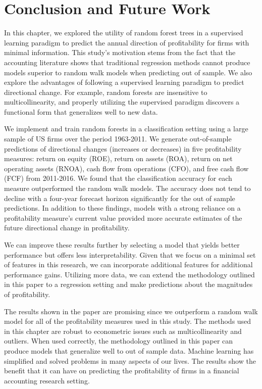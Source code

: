 \section{Conclusion and Future Work}

In this chapter, we explored the utility of random forest trees in a supervised learning paradigm to predict the annual direction of profitability for firms with minimal information. This study's motivation stems from the fact that the accounting literature shows that traditional regression methods cannot produce models superior to random walk models when predicting out of sample. We also explore the advantages of following a supervised learning paradigm to predict directional change. For example, random forests are insensitive to multicollinearity, and properly utilizing the supervised paradigm discovers a functional form that generalizes well to new data.

We implement and train random forests in a classification setting using a large sample of US firms over the period 1963-2011.  We generate out-of-sample predictions of directional changes (increases or decreases) in five profitability measures: return on equity (ROE), return on assets (ROA), return on net operating assets (RNOA), cash flow from operations (CFO), and free cash flow (FCF) from 2011-2016. We found that the classification accuracy for each measure outperformed the random walk models.  The accuracy does not tend to decline with a four-year forecast horizon significantly for the out of sample predictions. In addition to these findings, models with a strong reliance on a profitability measure's current value provided more accurate estimates of the future directional change in profitability.  

We can improve these results further by selecting a model that yields better performance but offers less interpretability. Given that we focus on a minimal set of features in this research, we can incorporate additional features for additional performance gains. Utilizing more data, we can extend the methodology outlined in this paper to a regression setting and make predictions about the magnitudes of profitability. 


The results shown in the paper are promising since  we outperform a random walk model for all of the profitability measures used in this study. The methods used in this chapter are robust to econometric issues such as multicollinearity and outliers.  When used correctly, the methodology outlined in this paper can produce models that generalize well to out of sample data.  Machine learning has simplified and solved problems in many aspects of our lives.  The results show the benefit that it can have on predicting the profitability of firms in a financial accounting research setting.

